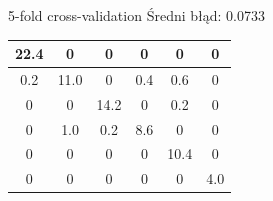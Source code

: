 \documentclass{beamer}
\begin{document}
\begin{frame}{5-fold cross-validation}
 Średni błąd: 0.0733
\vspace{0.5cm}

\begin{center}
{\LARGE 
\begin{tabular}{ | c | c | c | c | c | c |}
\hline
   22.4  &       0  &       0  &       0  &       0  &       0 \\ \hline
    0.2  & 11.0  &       0  &  0.4  &  0.6  &       0 \\ \hline
         0  &       0  & 14.2  &       0  &  0.2  &       0 \\ \hline
         0  &  1.0  &  0.2  &  8.6  &       0  &       0 \\ \hline
         0  &       0  &       0  &       0  & 10.4  &       0 \\ \hline
         0  &       0  &       0  &       0  &       0  &  4.0 \\ \hline
\end{tabular}
}
\end{center}
\end{frame}
\end{document}
